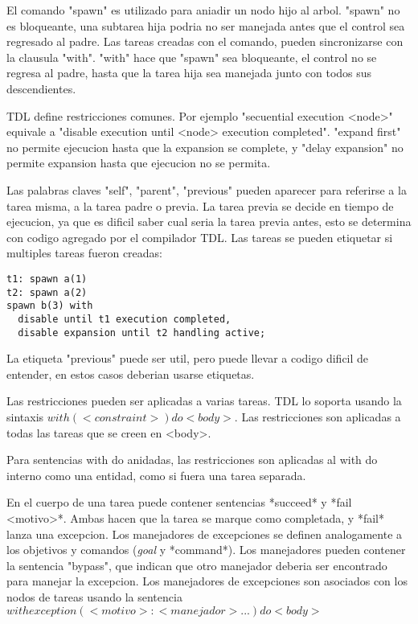 El comando "spawn" es utilizado para aniadir un nodo hijo al arbol. "spawn" 
no es bloqueante, una subtarea hija podria no ser
manejada antes que el control sea regresado al padre.
Las tareas creadas con el comando, pueden sincronizarse con la clausula "with".
 "with" hace que "spawn" sea bloqueante,
el control no se regresa al padre, hasta que la tarea hija sea manejada junto 
con todos sus descendientes.

TDL define restricciones comunes. Por ejemplo "secuential execution <node>"
equivale a "disable execution until <node> execution completed".
"expand first" no permite ejecucion hasta que la expansion se complete, y 
"delay expansion" no permite expansion hasta que ejecucion no se permita.

Las palabras claves "self", "parent", "previous" pueden aparecer
para referirse a la tarea misma, a la tarea padre o previa.
La tarea previa se decide en tiempo de ejecucion, ya que es dificil
saber cual seria la tarea previa antes, esto se determina con codigo agregado
por el compilador TDL.
Las tareas se pueden etiquetar si multiples tareas fueron creadas:

\begin{verbatim}
t1: spawn a(1)
t2: spawn a(2)
spawn b(3) with
  disable until t1 execution completed,
  disable expansion until t2 handling active;
\end{verbatim}

La etiqueta "previous" puede ser util, pero puede llevar a codigo dificil de 
entender, en estos casos deberian usarse etiquetas.

Las restricciones pueden ser aplicadas a varias tareas. TDL lo soporta
usando la sintaxis $with (<constraint>) do {<body>}$.
Las restricciones son aplicadas a todas las tareas que se creen en <body>.

Para sentencias with do anidadas, las restricciones son aplicadas al 
with do interno como una entidad, como si fuera una tarea separada.

En el cuerpo de una tarea puede contener sentencias *succeed* y 
*fail <motivo>*.
Ambas hacen que la tarea se marque como completada, y *fail* lanza una 
excepcion.
Los manejadores de excepciones se definen analogamente a los objetivos y 
comandos (\emph{goal} y *command*).
Los manejadores pueden contener la sentencia "bypass", que indican que otro
manejador deberia ser encontrado para manejar la excepcion.
Los manejadores de excepciones son asociados con los nodos de tareas usando
la sentencia $with exception (<motivo>:<manejador> ...) do {<body>}$

